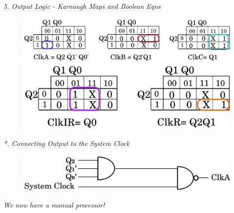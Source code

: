 \documentclass[twocolumn,english]{article}
\begin{document}
\emph{5. Output Logic - Karnaugh Maps and Boolean Eqns}

\begin{figure}[H]
\noindent \begin{centering}
\includegraphics[width=0.24\paperwidth]{img/ol-kmaps}
\par\end{centering}

\noindent \centering{}\includegraphics[width=0.16\paperwidth]{img/ol-kmaps'}
\end{figure}


\emph{{*}. Connecting Output to the System Clock}

\begin{figure}[H]
\noindent \begin{centering}
\includegraphics[width=0.175\paperwidth]{img/output-clock}
\par\end{centering}

\smallskip{}


\noindent {}
\end{figure}


\emph{We now have a manual processor!}
\end{document}

